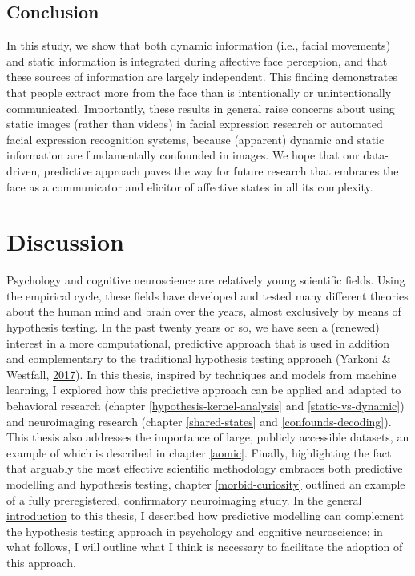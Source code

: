 \documentclass[11pt,american,a4paper,oneside,]{memoir} %
\begin{document}
\hypertarget{svsd-conclusion}{%
\section{Conclusion}\label{svsd-conclusion}}

In this study, we show that both dynamic information (i.e., facial movements) and static information is integrated during affective face perception, and that these sources of information are largely independent. This finding demonstrates that people extract more from the face than is intentionally or unintentionally communicated. Importantly, these results in general raise concerns about using static images (rather than videos) in facial expression research or automated facial expression recognition systems, because (apparent) dynamic and static information are fundamentally confounded in images. We hope that our data-driven, predictive approach paves the way for future research that embraces the face as a communicator and elicitor of affective states in all its complexity.

\hypertarget{general-discussion}{%
\chapter{Discussion}\label{general-discussion}}

Psychology and cognitive neuroscience are relatively young scientific fields. Using the empirical cycle, these fields have developed and tested many different theories about the human mind and brain over the years, almost exclusively by means of hypothesis testing. In the past twenty years or so, we have seen a (renewed) interest in a more computational, predictive approach that is used in addition and complementary to the traditional hypothesis testing approach (Yarkoni \& Westfall, \protect\hyperlink{ref-Yarkoni2017-om}{2017}). In this thesis, inspired by techniques and models from machine learning, I explored how this predictive approach can be applied and adapted to behavioral research (chapter \ref{hypothesis-kernel-analysis} and \ref{static-vs-dynamic}) and neuroimaging research (chapter \ref{shared-states} and \ref{confounds-decoding}). This thesis also addresses the importance of large, publicly accessible datasets, an example of which is described in chapter \ref{aomic}. Finally, highlighting the fact that arguably the most effective scientific methodology embraces both predictive modelling and hypothesis testing, chapter \ref{morbid-curiosity} outlined an example of a fully preregistered, confirmatory neuroimaging study. In the \protect\hyperlink{general-introduction}{general introduction} to this thesis, I described how predictive modelling can complement the hypothesis testing approach in psychology and cognitive neuroscience; in what follows, I will outline what I think is necessary to facilitate the adoption of this approach.
\end{document}
